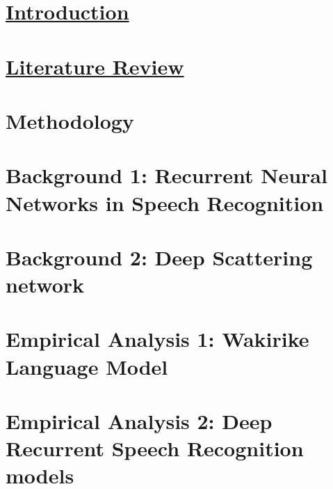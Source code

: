 \documentclass[12pt,twoside]{report}
\begin{document}
  
\chapter{\href{https://docs.google.com/document/d/1h8ZEcfEUpjJM6wYkgYYH-ryuiBFYVGSQA-Sf1StQtiY/edit#heading=h.i9tlo6ovvcpr}{Introduction}}\label{ch1_intro}


\chapter{\href{https://docs.google.com/document/d/1h8ZEcfEUpjJM6wYkgYYH-ryuiBFYVGSQA-Sf1StQtiY/edit#heading=h.i9tlo6ovvcpr}{Literature Review}}\label{c02}\label{ch2litrev}


\chapter{Methodology}\label{ch3Method}


\chapter{Background 1: Recurrent Neural Networks in Speech Recognition}\label{ch3RNN}


\chapter{Background 2: Deep Scattering network}\label{ch4DSN}


\chapter{Empirical Analysis 1: Wakirike Language Model}\label{ch6_wlm}


\chapter{Empirical Analysis 2: Deep Recurrent Speech Recognition models}\label{ch6_speech}

\end{document}
